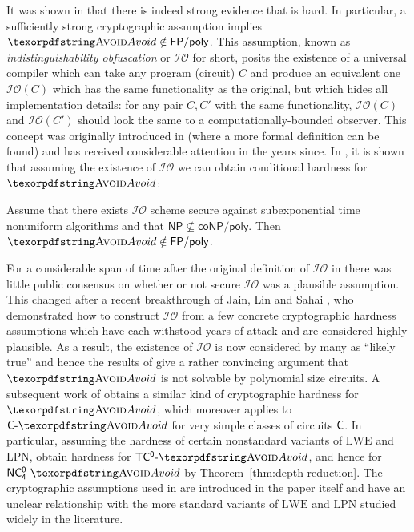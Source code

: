It was shown in \cite{ILW} that there is indeed strong evidence that \avoid is hard. In particular, a sufficiently strong cryptographic assumption implies $\avoid \notin \mathsf{FP/poly}$. This assumption, known as \emph{indistinguishability obfuscation} or $\mathcal{IO}$ for short, posits the existence of a universal compiler which can take any program (circuit) $C$ and produce an equivalent one $\mathcal{IO}(C)$ which has the same functionality as the original, but which hides all implementation details: for any pair $C,C'$ with the same functionality, $\mathcal{IO}(C)$ and $\mathcal{IO}(C')$ should look the same to a computationally-bounded observer. This concept was originally introduced in \cite{obfuscation} (where a more formal definition can be found) and has received considerable attention in the years since. In \cite{ILW}, it is shown that assuming the existence of $\mathcal{IO}$ we can obtain conditional hardness for $\avoid$:

\begin{theorem}\label{thm:avoid-io}
Assume that there exists $\mathcal{IO}$ scheme secure against subexponential time nonuniform algorithms and that $\mathsf{NP} \not\subseteq \mathsf{coNP/poly}$. Then $\avoid \notin \mathsf{FP/poly}$.
\end{theorem}

For a considerable span of time after the original definition of $\mathcal{IO}$ in \cite{obfuscation} there was little public consensus on whether or not secure $\mathcal{IO}$ was a plausible assumption. This changed after a recent breakthrough of Jain, Lin and Sahai \cite{JLS21}, who demonstrated how to construct $\mathcal{IO}$ from a few concrete cryptographic hardness assumptions which have each withstood years of attack and are considered highly plausible. As a result, the existence of $\mathcal{IO}$ is now considered by many as ``likely true'' and hence the results of \cite{ILW} give a rather convincing argument that $\avoid$ is not solvable by polynomial size circuits. A subsequent work of \cite{CL24} obtains a similar kind of cryptographic hardness for $\avoid$, which moreover applies to $\cl{C}\dash\avoid$ for very simple classes of circuits $\cl{C}$. In particular, assuming the hardness of certain nonstandard variants of $\mathrm{LWE}$ and $\mathrm{LPN}$, \cite{CL24} obtain hardness for $\mathsf{TC^0}\dash\avoid$, and hence for $\mathsf{NC^0_4}\dash\avoid$ by Theorem~\ref{thm:depth-reduction}. The cryptographic assumptions used in \cite{CL24} are introduced in the paper itself and have an unclear relationship with the more standard variants of  $\mathrm{LWE}$ and $\mathrm{LPN}$ studied widely in the literature.

